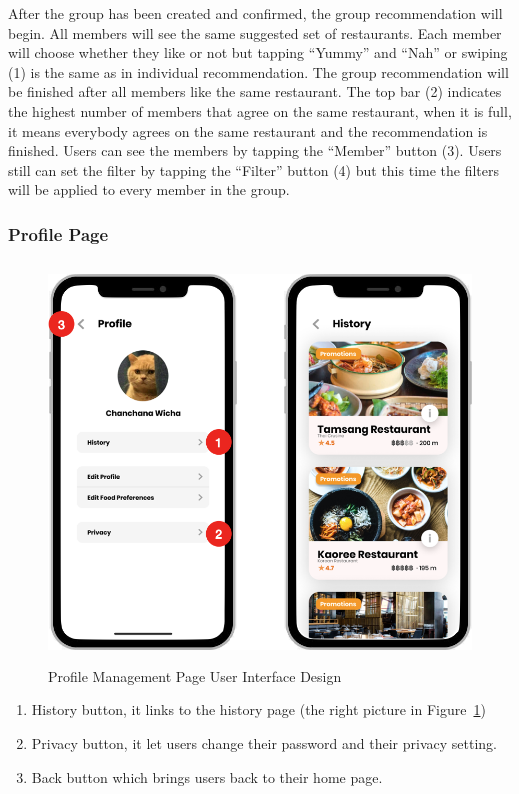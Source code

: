 \documentclass[12pt,oneside,openright,a4paper]{cpe-english-project}
\begin{document}
After the group has been created and confirmed, the group recommendation will begin. All members will see the same suggested set of restaurants. Each member will choose whether they like or not but tapping “Yummy” and “Nah” or swiping (1) is the same as in individual recommendation. The group recommendation will be finished after all members like the same restaurant. The top bar (2) indicates the highest number of members that agree on the same restaurant, when it is full, it means everybody agrees on the same restaurant and the recommendation is finished. Users can see the members by tapping the “Member” button (3). Users still can set the filter by tapping the “Filter” button (4) but this time the filters will be applied to every member in the group.

\newpage
\subsubsection{Profile Page}
\begin{figure}[H]\centering
\includegraphics[height=300pt]{./images/3ui_ProfileManagementPageUserInterfaceDesign.png}
\caption{Profile Management Page User Interface Design}\label{fig:3ui_ProfileManagementPageUserInterfaceDesign}
\end{figure}\vspace{-24pt}

\begin{enumerate}
\item History button, it links to the history page (the right picture in Figure~\ref{fig:3ui_ProfileManagementPageUserInterfaceDesign})
\item Privacy button, it let users change their password and their privacy setting.
\item Back button which brings users back to their home page.
\end{enumerate}
\end{document}

